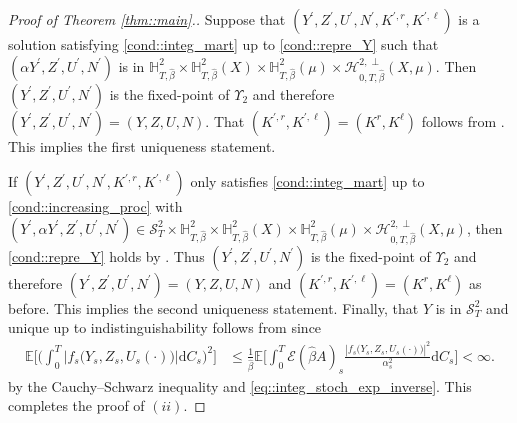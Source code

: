 \documentclass[10pt]{article} %
\newcommand\cE{\mathcal E}
\newcommand\cH{\mathcal H}
\newcommand\cS{\mathcal S}
\def \E{\mathbb{E}}
\def \H{\mathbb{H}}
\def\d{\mathrm{d}}
\begin{document}
\begin{proof}[Proof of Theorem \ref{thm::main}.]
	\medskip
	Suppose that $(Y^\prime,Z^\prime,U^\prime,N^\prime,K^{\prime,r},K^{\prime,\ell})$ is a solution satisfying \ref{cond::integ_mart} up to \ref{cond::repre_Y} such that $(\alpha Y^\prime,Z^\prime,U^\prime,N^\prime)$ is in $\H^2_{T,\hat\beta} \times \H^2_{T,\hat\beta}(X) \times \H^2_{T,\hat\beta}(\mu) \times \cH^{2,\perp}_{0,T,\hat\beta}(X,\mu)$. Then $(Y^\prime,Z^\prime,U^\prime,N^\prime)$ is the fixed-point of $\Upsilon_2$ and therefore $(Y^\prime,Z^\prime,U^\prime,N^\prime) = (Y,Z,U,N)$. That $(K^{\prime,r},K^{\prime,\ell}) = (K^r,K^\ell)$ follows from . This implies the first uniqueness statement. 
	
	\medskip
	If $(Y^\prime,Z^\prime,U^\prime,N^\prime,K^{\prime,r},K^{\prime,\ell})$ only satisfies \ref{cond::integ_mart} up to \ref{cond::increasing_proc} with $( Y^\prime, \alpha Y^\prime, Z^\prime, U^\prime, N^\prime) \in \cS^2_T \times \H^2_{T,\hat\beta} \times \H^2_{T,\hat\beta}(X) \times \H^2_{T,\hat\beta}(\mu) \times \cH^{2,\perp}_{0,T,\hat\beta}(X,\mu)$, then \ref{cond::repre_Y} holds by . Thus $(Y^\prime,Z^\prime,U^\prime,N^\prime)$ is the fixed-point of $\Upsilon_2$ and therefore $(Y^\prime,Z^\prime,U^\prime,N^\prime) = (Y,Z,U,N)$ and $(K^{\prime,r},K^{\prime,\ell}) = (K^r,K^\ell)$ as before. This implies the second uniqueness statement. Finally, that $Y$ is in $\cS^2_T$ and unique up to indistinguishability follows from  since
	\begin{align*}
		\E\bigg[\bigg(\int_0^T |f_s\big(Y_s,Z_s,U_s(\cdot)\big)| \d C_s\bigg)^2\bigg] 
		&\leq \frac{1}{\hat\beta}\E\bigg[\int_0^T \cE(\hat\beta A)_s\frac{|f_s\big(Y_s,Z_s,U_s(\cdot)\big)|^2}{\alpha^2_s} \d C_s\bigg] < \infty.
	\end{align*}
	by the Cauchy--Schwarz inequality and \eqref{eq::integ_stoch_exp_inverse}.
	This completes the proof of $(ii)$. 
	

\end{proof}
\end{document}
